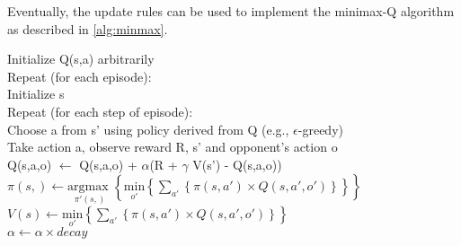 Eventually, the update rules can be used to implement the minimax-Q algorithm as described in \ref{alg:minmax}.

\begin{center} 
\begin{mdframed}
\begin{algorithm}[H]
Initialize Q(s,a) arbitrarily \\
Repeat (for each episode):\\
\tab Initialize s \\
\tab Repeat (for each step of episode):\\
\dtab Choose a from s' using policy derived from Q (e.g., $\epsilon$-greedy)\\
\dtab Take action a, observe reward R, s' and opponent's action o\\
\dtab Q(s,a,o) $\leftarrow$ Q(s,a,o) + $\alpha $(R + $\gamma$ V(s') - Q(s,a,o))  \\
\dtab $\pi(s,) \leftarrow \underset{\pi'(s,)}{\text{argmax }} \left\{ \underset{o'}{\text{min}} \left\{ \sum_{a'}  \left\{ \pi(s,a') \times Q(s,a',o') \right\} \right\} \right\}$ \\
\dtab $ V(s) \leftarrow \underset{o'}{\text{min}} \left\{ \sum_{a'}  \left\{ \pi(s,a') \times Q(s,a',o') \right\} \right\}  $ \\
\dtab $\alpha \leftarrow \alpha \times decay$
\end{algorithm}
\end{mdframed}
\label{alg:minmax}
\end{center}



